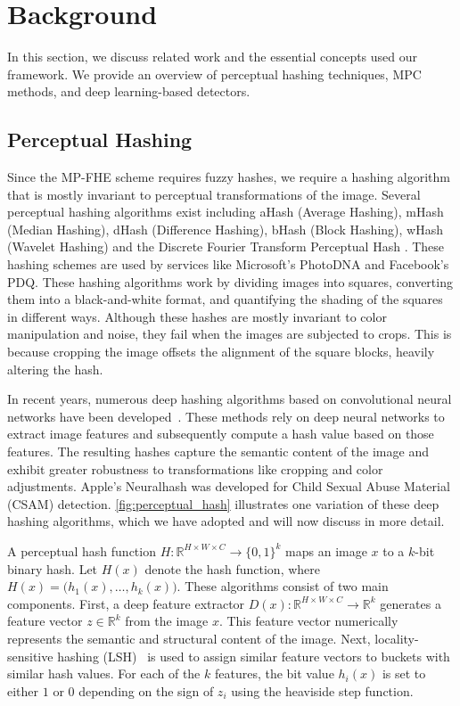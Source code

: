 
\section{Background}
In this section, we discuss related work and the essential concepts used our framework. We provide an overview of perceptual hashing techniques, MPC methods, and deep learning-based detectors.

\subsection{Perceptual Hashing}



Since the MP-FHE scheme requires fuzzy hashes, we require a hashing algorithm that is mostly invariant to perceptual transformations of the image. Several perceptual hashing algorithms exist including aHash (Average Hashing), mHash (Median Hashing), dHash (Difference Hashing), bHash (Block Hashing), wHash (Wavelet Hashing) and the Discrete Fourier Transform Perceptual Hash \cite{Zauner2010ImplementationAB}. These hashing schemes are used by services like Microsoft’s PhotoDNA and Facebook’s PDQ. These hashing algorithms work by dividing images into squares, converting them into a black-and-white format, and quantifying the shading of the squares in different ways. Although these hashes are mostly invariant to color manipulation and noise, they fail when the images are subjected to crops. This is because cropping the image offsets the alignment of the square blocks, heavily altering the hash. 

In recent years, numerous deep hashing algorithms based on convolutional neural networks have been developed~\cite{deep_hashing_compact_codes, deep_supervised_hashing_fast_retrieval, deep_semantic_ranking_hashing_multilabel, deep_supervised_hashing_large_scale}. These methods rely on deep neural networks to extract image features and subsequently compute a hash value based on those features. The resulting hashes capture the semantic content of the image and exhibit greater robustness to transformations like cropping and color adjustments. Apple's Neuralhash \cite{struppek2022learning} was developed for Child Sexual Abuse Material (CSAM) detection. \autoref{fig:perceptual_hash} illustrates one variation of these deep hashing algorithms, which we have adopted and will now discuss in more detail.


A perceptual hash function $H \colon \mathbb{R}^{H \times W \times C} \to \{0,1\}^k$ maps an image $x$ to a $k$-bit binary hash. Let $H(x)$ denote the hash function, where $H(x) = \bigl( h_1(x), \ldots, h_k(x) \bigr)$. These algorithms consist of two main components. First, a deep feature extractor $D(x)\colon \mathbb{R}^{H \times W \times C} \to \mathbb{R}^{k}$ generates a feature vector $z \in \mathbb{R}^{k}$ from the image $x$. This feature vector numerically represents the semantic and structural content of the image. Next, locality-sensitive hashing (LSH)~\cite{locality, jafari2021surveylocalitysensitivehashing} is used to assign similar feature vectors to buckets with similar hash values. For each of the $k$ features, the bit value $h_i(x)$ is set to either $1$ or $0$ depending on the sign of $z_i$ using the heaviside step function.

